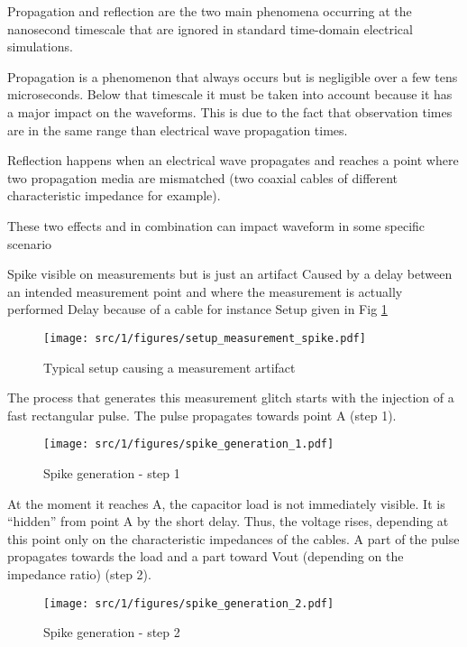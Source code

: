 Propagation and reflection are the two main phenomena occurring at the nanosecond timescale that are ignored in standard time-domain electrical simulations.

Propagation is a phenomenon that always occurs but is negligible over a few tens microseconds.
Below that timescale it must be taken into account because it has a major impact on the waveforms.
This is due to the fact that observation times are in the same range than electrical wave propagation times.

Reflection happens when an electrical wave propagates and reaches a point where two propagation media are mismatched (two coaxial cables of different characteristic impedance for example).

These two effects and in combination can impact waveform in some specific scenario

Spike visible on measurements but is just an artifact
Caused by a delay between an intended measurement point and where the measurement is actually performed
Delay because of a cable for instance
Setup given in Fig \ref{fig:setup-measurement-spike}

\begin{figure}[!h]
  \centering
  \texttt{[image: src/1/figures/setup\_measurement\_spike.pdf]}
  \caption{Typical setup causing a measurement artifact}
  \label{fig:setup-measurement-spike}
\end{figure}

The process that generates this measurement glitch starts with the injection of a fast rectangular pulse.
The pulse propagates towards point A (step 1).

\begin{figure}[!h]
  \centering
  \texttt{[image: src/1/figures/spike\_generation\_1.pdf]}
  \caption{Spike generation - step 1}
  \label{fig:spike-step-1}
\end{figure}

At the moment it reaches A, the capacitor load is not immediately visible.
It is “hidden” from point A by the short delay.
Thus, the voltage rises, depending at this point only on the characteristic impedances of the cables.
A part of the pulse propagates towards the load and a part toward Vout (depending on the impedance ratio) (step 2).

\begin{figure}[!h]
  \centering
  \texttt{[image: src/1/figures/spike\_generation\_2.pdf]}
  \caption{Spike generation - step 2}
  \label{fig:spike-step-2}
\end{figure}

